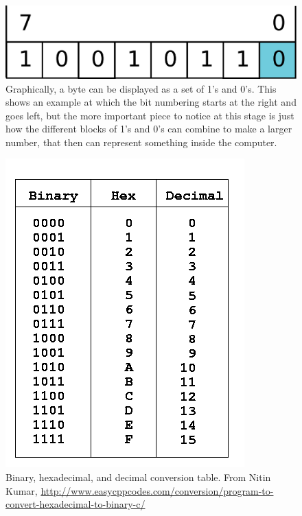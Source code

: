 \documentclass[a4paper,10pt]{scrartcl}
\begin{document}
\begin{figure}[!ht]
\begin{center}
\includegraphics[width=.8\linewidth]{figures/Introduction/Lsb0.pdf}
\end{center}
\caption{Graphically, a byte can be displayed as a set of 1's and 0's. This shows an example at which the bit numbering starts at the right and goes left, but the more important piece to notice at this stage is just how the different blocks of 1's and 0's can combine to make a larger number, that then can represent something inside the computer.}
\end{figure}

\begin{figure}[!ht]
 \begin{center}
 \includegraphics[width=.8\linewidth]{figures/Introduction/convert-hexadecimal-to-binary-C-.png}
 \end{center}
 \caption{Binary, hexadecimal, and decimal conversion table. From Nitin Kumar, \url{http://www.easycppcodes.com/conversion/program-to-convert-hexadecimal-to-binary-c/}}
\end{figure}
\end{document}
